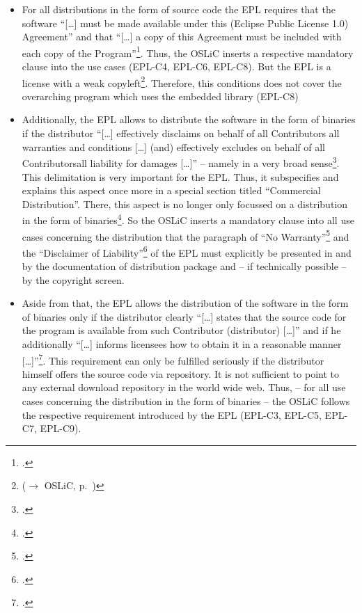 \begin{itemize}
  \item For all distributions in the form of source code the EPL requires that
  the software \enquote{[\ldots] must be made available under this (Eclipse
  Public License 1.0) Agreement} and that \enquote{[\ldots] a copy of this
  Agreement must be included with each copy of the
  Program}\footcite[cf.][\nopage wp.\ §3]{Epl10OsiLicense2005a}. Thus, the OSLiC
  inserts a respective mandatory clause into the use cases (EPL-C4, EPL-C6,
  EPL-C8). But the EPL is a license with a weak copyleft\footnote{($\rightarrow$
  OSLiC, p.\ \pageref{sec:ProtectingPowerOfEpl})}. Therefore, this conditions
  does not cover the overarching program which uses the embedded library (EPL-C8)
  
  \item Additionally, the EPL allows to distribute the software in the form
  of binaries if the distributor \enquote{[\ldots] effectively disclaims on
  behalf of all Contributors all warranties and conditions [\ldots] (and)
  effectively excludes on behalf of all Contributorsall liability for damages
  [\ldots]} -- namely in a very broad sense\footcite[cf.][\nopage wp.\
  §3]{Epl10OsiLicense2005a}. This delimitation is very important for the EPL.
  Thus, it subspecifies and explains this aspect once more in a special section
  titled \enquote{Commercial Distribution}. There, this aspect is no longer only
  focussed on a distribution in the form of binaries\footcite[cf.][\nopage wp.\
  §4]{Epl10OsiLicense2005a}. So the OSLiC inserts a mandatory clause into all
  use cases concerning the distribution that the paragraph of \enquote{No
  Warranty}\footcite[cf.][\nopage wp.\ §5]{Epl10OsiLicense2005a} and the
  \enquote{Disclaimer of Liability}\footcite[cf.][\nopage wp.\
  §6]{Epl10OsiLicense2005a} of the EPL must explicitly be presented in and by
  the documentation of distribution package
  and -- if technically possible -- by the copyright screen.
  
  \item Aside from that, the EPL allows the distribution of the software in the
  form of binaries only if the distributor clearly \enquote{[\ldots] states that
  the source code for the program is available from such Contributor
  (distributor) [\ldots]} and if he additionally \enquote{[\ldots] informs
  licensees how to obtain it in a reasonable manner
  [\ldots]}\footcite[cf.][\nopage wp.\ §3]{Epl10OsiLicense2005a}. This
  requirement can only be fulfilled seriously if the distributor himself offers
  the source code via repository. It is not sufficient to point to any external
  download repository in the world wide web. Thus, -- for all use cases
  concerning the distribution in the form of binaries -- the OSLiC follows the
  respective requirement introduced by the EPL (EPL-C3, EPL-C5, EPL-C7, EPL-C9).
  

\end{itemize}
